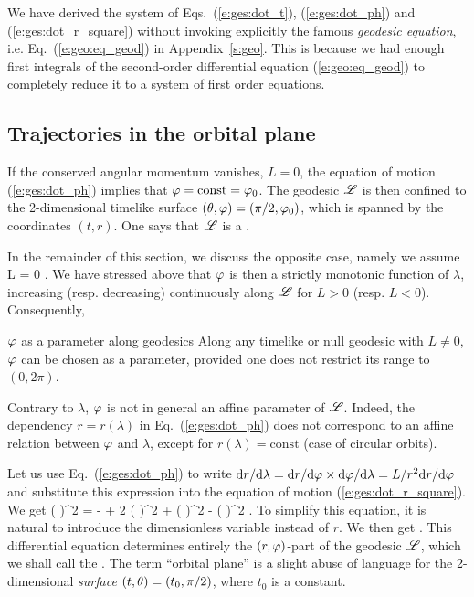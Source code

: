 \begin{remark}
We have derived the system of Eqs.~(\ref{e:ges:dot_t}), (\ref{e:ges:dot_ph}) and (\ref{e:ges:dot_r_square}) without invoking explicitly the
famous \emph{geodesic equation}, i.e.
Eq.~(\ref{e:geo:eq_geod}) in Appendix~\ref{s:geo}.
This is because we had enough
first integrals of the second-order differential equation
(\ref{e:geo:eq_geod})
to completely reduce it to
a system of first order equations.
\end{remark}

\subsection{Trajectories in the orbital plane} \label{s:ges:trajectories}

If the conserved angular momentum vanishes, $L=0$, the equation of motion
(\ref{e:ges:dot_ph}) implies that $\varphi = \mathrm{const} = \varphi_0$. The geodesic
$\mathscr{L}$ is then confined to the 2-dimensional timelike surface
$(\theta, \varphi) = (\pi/2,\varphi_0)$, which is spanned by the coordinates $(t, r)$.
One says that $\mathscr{L}$ is a .

In the remainder of this section, we discuss the opposite case, namely we
assume
\be
    L \not = 0 .
\ee
We have stressed above that $\varphi$ is then a strictly monotonic function of $\lambda$,
increasing (resp. decreasing) continuously along $\mathscr{L}$ for $L>0$ (resp. $L<0$).
Consequently,
\begin{tprop}{$\varphi$ as a parameter along geodesics}{}
Along any timelike or null geodesic with $L\not =0$,
$\varphi$ can be chosen as a parameter, provided one does not restrict its
range to $(0,2\pi)$.
\end{tprop}
Contrary to $\lambda$, $\varphi$ is not in general an affine parameter of $\mathscr{L}$.
Indeed, the dependency $r = r(\lambda)$ in Eq.~(\ref{e:ges:dot_ph})
does not correspond to an affine relation between $\varphi$ and $\lambda$, except for
$r(\lambda) = \mathrm{const}$ (case of circular orbits).

Let us use Eq.~(\ref{e:ges:dot_ph}) to write
$\mathrm{d} r/ \mathrm{d}\lambda = \mathrm{d} r/\mathrm{d}\varphi \times \mathrm{d}\varphi/\mathrm{d}\lambda = L/r^2 \mathrm{d} r /\mathrm{d}\varphi$
and substitute this expression into the equation of motion
(\ref{e:ges:dot_r_square}). We get
\be
     \left(  \right)^2 =
      -  + 2  \left(  \right)^2 
     + \left(  \right)^2 - \left(  \right)^2 .
\ee
To simplify this equation, it is natural to introduce the dimensionless variable
\be \label{e:ges:def_u}
\ee
instead of $r$. We then get
\be \label{e:ges:DuDph_trajectories}
    .
\ee
This differential equation determines entirely the $(r,\varphi)$-part of the geodesic $\mathscr{L}$,
which we shall call the
.
The term ``orbital plane'' is a slight abuse of language for
the 2-dimensional \emph{surface} $(t,\theta) = (t_0, \pi/2)$, where $t_0$ is a constant.


